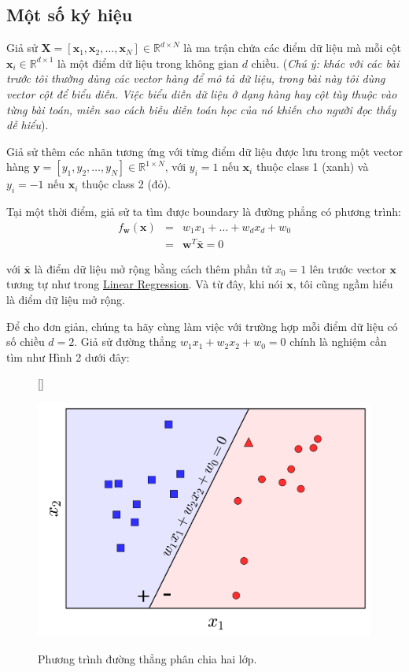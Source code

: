  
\subsection{Một số ký hiệu}
Giả sử $\mathbf{X} = [\mathbf{x}_1, \mathbf{x}_2, \dots, \mathbf{x}_N] \in \mathbb{R}^{d \times N}$ là ma trận chứa các điểm dữ liệu mà mỗi cột $\mathbf{x}_i \in \mathbb{R}^{d\times 1}$ là một điểm dữ liệu trong không gian $d$ chiều. (\textit{Chú ý: khác với các bài trước tôi thường dùng các vector hàng để mô tả dữ liệu, trong bài này tôi dùng vector cột để biểu diễn. Việc biểu diễn dữ liệu ở dạng hàng hay cột tùy thuộc vào từng bài toán, miễn sao cách biễu diễn toán học của nó khiến cho người đọc thấy dễ hiểu}). 
 
Giả sử thêm các nhãn tương ứng với từng điểm dữ liệu được lưu trong một vector hàng $\mathbf{y} = [y_1, y_2, \dots, y_N] \in \mathbb{R}^{1\times N}$, với $y_i = 1$ nếu $\mathbf{x}_i$ thuộc class 1 (xanh) và $y_i = -1$ nếu $\mathbf{x}_i$ thuộc class 2 (đỏ). 
 
Tại một thời điểm, giả sử ta tìm được boundary là đường phẳng có phương trình: 
\begin{eqnarray} 
    f_{\mathbf{w}}(\mathbf{x}) &=& w_1x_1 + \dots + w_dx_d + w_0 \\\  
    &=&\mathbf{w}^T\mathbf{\bar{x}} = 0 
\end{eqnarray} 
 
với $\mathbf{\bar{x}}$ là điểm dữ liệu mở rộng bằng cách thêm phần tử $x_0 = 1$ lên trước vector $\mathbf{x}$ tương tự như trong \href{http://machinelearningcoban.com/2016/12/28/linearregression/}{Linear Regression}. Và từ đây, khi nói $\mathbf{x}$, tôi cũng ngầm hiểu là điểm dữ liệu mở rộng. 
 
Để cho đơn giản, chúng ta hãy cùng làm việc với trường hợp mỗi điểm dữ liệu có số chiều $d = 2$. Giả sử đường thẳng $w_1 x_1 + w_2 x_2 + w_0 = 0$ chính là nghiệm cần tìm như Hình 2 dưới đây: 
 

\begin{figure}[t]
     [\FBwidth]
     {\caption{ 
     Phương trình đường thẳng phân chia hai lớp.
     }
     \label{fig:9_2}}
     { %
     \includegraphics[width=.5\textwidth]{Chapters/05_NeuralNetworks/09_perceptron/pla4.png}
     }
 \end{figure}

